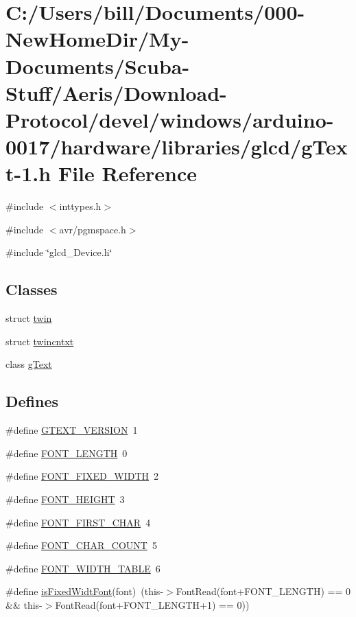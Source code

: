 \hypertarget{g_text-1_8h}{
\section{C:/Users/bill/Documents/000-\/NewHomeDir/My-\/Documents/Scuba-\/Stuff/Aeris/Download-\/Protocol/devel/windows/arduino-\/0017/hardware/libraries/glcd/gText-\/1.h File Reference}
\label{g_text-1_8h}
}
{\ttfamily \#include $<$inttypes.h$>$}\par
{\ttfamily \#include $<$avr/pgmspace.h$>$}\par
{\ttfamily \#include \char`\"{}glcd\_\-Device.h\char`\"{}}\par
\subsection*{Classes}
\begin{DoxyCompactItemize}
\item 
struct \hyperlink{structtwin}{twin}
\item 
struct \hyperlink{structtwincntxt}{twincntxt}
\item 
class \hyperlink{classg_text}{gText}
\end{DoxyCompactItemize}
\subsection*{Defines}
\begin{DoxyCompactItemize}
\item 
\#define \hyperlink{g_text-1_8h_abc8b7a6d70f9533c94c8bf3e9291412a}{GTEXT\_\-VERSION}~1
\item 
\#define \hyperlink{g_text-1_8h_ae06dc7b9804bb102859f0e32754e79a5}{FONT\_\-LENGTH}~0
\item 
\#define \hyperlink{g_text-1_8h_afc65866121cd2eba3caa85d2946eeec0}{FONT\_\-FIXED\_\-WIDTH}~2
\item 
\#define \hyperlink{g_text-1_8h_a33f4fac49f2a5e27e2857eb27f054510}{FONT\_\-HEIGHT}~3
\item 
\#define \hyperlink{g_text-1_8h_abf840ca631179d25994d5f1dc3594646}{FONT\_\-FIRST\_\-CHAR}~4
\item 
\#define \hyperlink{g_text-1_8h_a4546cd12e3ae03bca0659ed77eeb872e}{FONT\_\-CHAR\_\-COUNT}~5
\item 
\#define \hyperlink{g_text-1_8h_ae6bf0901cff58e47324da9487d0ee938}{FONT\_\-WIDTH\_\-TABLE}~6
\item 
\#define \hyperlink{g_text-1_8h_ae32f2f70c6fb954fc54e063f26cc634e}{isFixedWidtFont}(font)~(this-\/$>$FontRead(font+FONT\_\-LENGTH) == 0 \&\& this-\/$>$FontRead(font+FONT\_\-LENGTH+1) == 0))
\end{DoxyCompactItemize}
